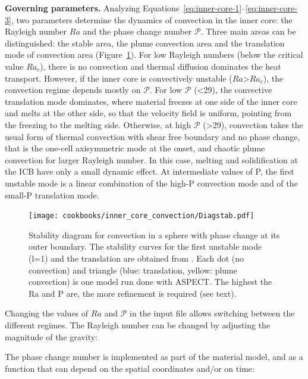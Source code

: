 \documentclass{article}
\begin{document}
\vspace{0.3cm}
\textbf{Governing parameters.}  Analyzing Equations~\eqref{eq:inner-core-1}--\eqref{eq:inner-core-3}, two parameters determine 
the dynamics of convection in the inner core: the Rayleigh number $Ra$ and the phase change number $\mathcal{P}$. 
Three main areas can be distinguished: the stable area, the plume convection area and the translation mode of convection area (Figure~\ref{fig:diagramme-regime}). For low Rayleigh numbers (below the critical value $Ra_c$), there is no convection and thermal diffusion dominates the heat transport. However, if the inner core is convectively unstable ($Ra$>$Ra_c$), the convection regime depends mostly on $\mathcal{P}$. For low $\mathcal{P}$ (<29), the convective translation mode dominates, where material freezes at one side of the inner core and melts at the other side, so that the velocity field is uniform, pointing from the freezing to the melting side. Otherwise, at high $\mathcal{P}$ (>29), convection takes the usual form of thermal convection with shear free boundary and no phase change, that is the one-cell axisymmetric mode at the onset, and chaotic plume convection for larger Rayleigh number. In this case, melting and solidification at the ICB have only a small dynamic effect. At intermediate values of P, the first unstable mode is a linear combination of the high-P convection mode and of the small-P translation mode.


\begin{figure}[h]
\begin{center}
\texttt{[image: cookbooks/inner\_core\_convection/Diagstab.pdf]}
	\caption{Stability diagram for convection in a sphere with phase change at its outer boundary. The stability curves for the first unstable mode (l=1) and the translation are obtained from \cite{Deguen2013}. Each dot (no convection) and triangle (blue: translation, yellow: plume convection) is one model run done with ASPECT. The highest the Ra and P are, the more refinement is required (see text).}
    \label{fig:diagramme-regime}
\end{center}
\end{figure}


Changing the values of $Ra$ and $\mathcal{P}$ in the input file allows switching between the different regimes.
The Rayleigh number can be changed by adjusting the magnitude of the gravity:

The phase change number is implemented as part of the material model, and as a function that can depend on the 
spatial coordinates and/or on time: 

\end{document}
